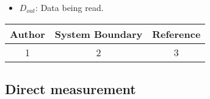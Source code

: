 \begin{itemize}
    \item $D_{out}$: Data being read.
\end{itemize}




\begin{center}
    \begin{tabular}{|| c | c | c ||}
        \hline
        Author & System Boundary & Reference \\
        \hline\hline
        1 & 2 & 3 \\
        \hline
    \end{tabular}
\end{center}


\subsection{Direct measurement}



